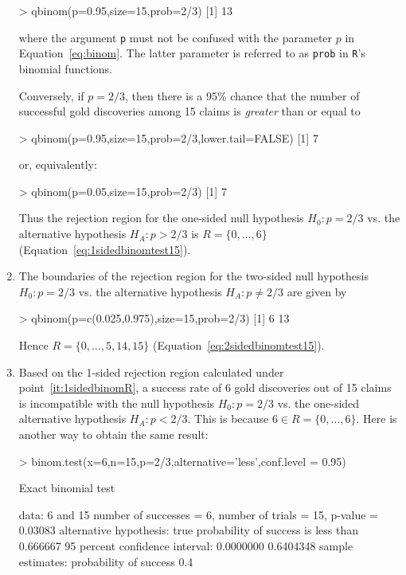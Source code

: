 \begin{enumerate}
\begin{console}
> qbinom(p=0.95,size=15,prob=2/3)
[1] 13
\end{console}

\noindent where the argument \texttt{p} must not be confused with the
parameter $p$ in Equation~\ref{eq:binom}. The latter parameter is
referred to as \texttt{prob} in \texttt{R}'s binomial functions.

Conversely, if $p=2/3$, then there is a 95\% chance that the number of
successful gold discoveries among 15 claims is \emph{greater} than or
equal to
  
\begin{console}
> qbinom(p=0.95,size=15,prob=2/3,lower.tail=FALSE)
[1] 7
\end{console}

\noindent or, equivalently:

\begin{console}
> qbinom(p=0.05,size=15,prob=2/3)
[1] 7
\end{console}

Thus the rejection region for the one-sided null hypothesis $H_0:
p=2/3$ vs. the alternative hypothesis $H_{\!A}: p>2/3$ is $R =
\{0,\ldots,6\}$ (Equation~\ref{eq:1sidedbinomtest15}).

\item\label{it:2sidedbinomR} The boundaries of the rejection region
  for the two-sided null hypothesis $H_0: p=2/3$ vs. the
  alternative hypothesis $H_{\!A}: p\neq{2/3}$ are given by

\begin{console}
> qbinom(p=c(0.025,0.975),size=15,prob=2/3)
[1] 6 13
\end{console}

Hence $R = \{0,\ldots,5,14,15\}$
(Equation~\ref{eq:2sidedbinomtest15}).

\item Based on the 1-sided rejection region calculated under
  point~\ref{it:1sidedbinomR}, a success rate of 6 gold discoveries
  out of 15 claims is incompatible with the null hypothesis $H_0:
  p=2/3$ vs.  the one-sided alternative hypothesis $H_{\!A}: p<2/3$. This
  is because $6 \in R=\{0,\ldots,6\}$.  Here is another way to obtain
  the same result:

\begin{console}
> binom.test(x=6,n=15,p=2/3,alternative='less',conf.level = 0.95)

	Exact binomial test

data:  6 and 15
number of successes = 6, number of trials = 15, p-value = 0.03083
alternative hypothesis: true probability of success is less than 0.666667
95 percent confidence interval:
 0.0000000 0.6404348
sample estimates:
probability of success 
                   0.4   
\end{console}


\end{enumerate}
